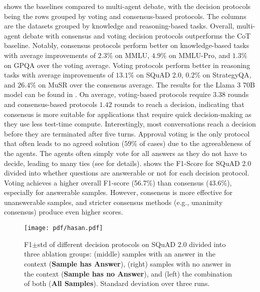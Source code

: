  shows the baselines compared to multi-agent debate, with the decision protocols being the rows grouped by voting and consensus-based protocols.
The columns are the datasets grouped by knowledge and reasoning-based tasks.
Overall, multi-agent debate with consensus and voting decision protocols outperforms the \ac{CoT} baseline. 
Notably, consensus protocols perform better on knowledge-based tasks with average improvements of $2.3\%$ on MMLU, $4.9\%$ on MMLU-Pro, and $1.3\%$ on GPQA over the voting average.
Voting protocols perform better in reasoning tasks with average improvements of $13.1\%$ on SQuAD 2.0, $0.2\%$ on StrategyQA, and $26.4\%$ on MuSR over the consensus average.
The results for the Llama 3 70B model can be found in .
On average, voting-based protocols require $3.38$ rounds and consensus-based protocols $1.42$ rounds to reach a decision, indicating that consensus is more suitable for applications that require quick decision-making as they use less test-time compute.
Interestingly, most conversations reach a decision before they are terminated after five turns.
Approval voting is the only protocol that often leads to no agreed solution ($59\%$ of cases) due to the agreeableness of the agents. 
The agents often simply vote for all answers as they do not have to decide, leading to many ties (see  for details). 
 shows the F1-Score for SQuAD 2.0 divided into whether questions are answerable or not for each decision protocol.
Voting achieves a higher overall F1-score (56.7\%) than consensus (43.6\%), especially for answerable samples.
However, consensus is more effective for unanswerable samples, and stricter consensus methods (e.g., unanimity consensus) produce even higher scores.

\begin{figure}[t]
    \centering
    \texttt{[image: pdf/hasan.pdf]}
    \caption{F1{\tiny$\pm$std} of different decision protocols on SQuAD 2.0 divided into three ablation groups: (middle) samples with an answer in the context (\textbf{Sample has Answer}), (right) samples with no answer in the context (\textbf{Sample has no Answer}), and (left) the combination of both (\textbf{All Samples}). %
    Standard deviation over three runs.}
    \label{fig:squad_divided}
\end{figure}

